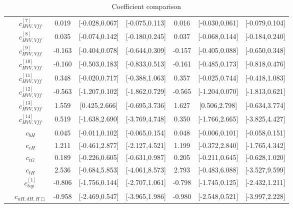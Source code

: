 \documentclass{article}
\begin{document}
\begin{table}[H]
\begin{tabular}{|c|c|c|c|c|c|c|c|}
 & $c_{HVV,Vff}^{[7]}$ & 0.019 & [-0.028,0.067] & [-0.075,0.113]  & 0.016 & [-0.030,0.061] & [-0.079,0.104]  \\ \cline{2-8}
 & $c_{HVV,Vff}^{[8]}$ & 0.035 & [-0.074,0.142] & [-0.180,0.245]  & 0.037 & [-0.068,0.144] & [-0.184,0.240]  \\ \cline{2-8}
 & $c_{HVV,Vff}^{[9]}$ & -0.163 & [-0.404,0.078] & [-0.644,0.309]  & -0.157 & [-0.405,0.088] & [-0.650,0.348]  \\ \cline{2-8}
 & $c_{HVV,Vff}^{[10]}$ & -0.160 & [-0.503,0.183] & [-0.833,0.513]  & -0.161 & [-0.485,0.173] & [-0.818,0.476]  \\ \cline{2-8}
 & $c_{HVV,Vff}^{[11]}$ & 0.348 & [-0.020,0.717] & [-0.388,1.063]  & 0.357 & [-0.025,0.744] & [-0.418,1.083]  \\ \cline{2-8}
 & $c_{HVV,Vff}^{[12]}$ & -0.563 & [-1.207,0.102] & [-1.862,0.729]  & -0.565 & [-1.204,0.070] & [-1.813,0.621]  \\ \cline{2-8}
 & $c_{HVV,Vff}^{[13]}$ & 1.559 & [0.425,2.666] & [-0.695,3.736]  & 1.627 & [0.506,2.798] & [-0.634,3.774]  \\ \cline{2-8}
 & $c_{HVV,Vff}^{[14]}$ & 0.519 & [-1.638,2.690] & [-3.769,4.748]  & 0.350 & [-1.766,2.665] & [-3.825,4.427]  \\ \cline{2-8}
 & $c_{bH}$ & 0.045 & [-0.011,0.102] & [-0.065,0.154]  & 0.048 & [-0.006,0.101] & [-0.058,0.151]  \\ \cline{2-8}
 & $c_{eH}$ & 1.211 & [-0.461,2.877] & [-2.127,4.521]  & 1.199 & [-0.372,2.840] & [-1.765,4.342]  \\ \cline{2-8}
 & $c_{tG}$ & 0.189 & [-0.226,0.605] & [-0.631,0.987]  & 0.205 & [-0.211,0.645] & [-0.628,1.020]  \\ \cline{2-8}
 & $c_{tH}$ & 2.536 & [-0.684,5.853] & [-4.061,8.573]  & 2.793 & [-0.483,6.088] & [-3.527,9.599]  \\ \cline{2-8}
 & $c_{top}^{[1]}$ & -0.806 & [-1.756,0.144] & [-2.707,1.061]  & -0.798 & [-1.745,0.125] & [-2.432,1.211]  \\ \cline{2-8}
 & $c_{uH,dH,H\Box}$ & -0.958 & [-2.469,0.547] & [-3.965,1.986]  & -0.980 & [-2.548,0.521] & [-3.997,2.228]  \\ \cline{2-8}
\hline
\end{tabular}
\caption{Coefficient comparison}
\end{table}
\end{document}
